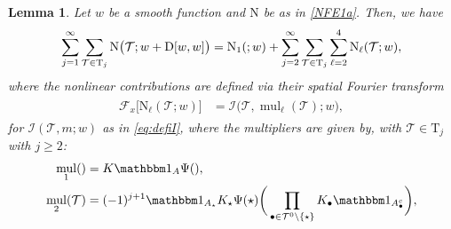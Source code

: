 \documentclass[%
11pt,  reqno]{amsart}
\makeatletter
\newcommand{\5}{\textup{V}}
\newcommand{\ind}{\mathbbm 1}
\newtheorem{lemma}[theorem]{Lemma}
\theoremstyle{remark}
\newcommand{\bul}{\bullet}
\newcommand{\TT}{\mathcal{T}}
\newcommand{\Tr}{\mathrm{T}}
\newcommand{\bfrak}{\mathfrak{b}}
\newcommand{\gfrak}{\mathfrak{g}}
\newcommand{\Ft}{{\mathcal{F}}}
\renewcommand{\l}{\ell}
\DeclareMathOperator{\mul}{mul}
\def\<#1>{\csname MH@symb@#1\endcsname}
\newcommand{\Ical}{\mathcal{I}}
\numberwithin{equation}{section}
\numberwithin{theorem}{section}
\newcommand{\NN}{\mathrm{N}}
\newcommand{\D}{\mathrm{D}}
\makeatother
\begin{document}
\begin{lemma}
\label{LEM:wint}
Let $w$ be a smooth function and $\NN$ be as in \eqref{NFE1a}.
Then, we have
\begin{align}
\label{wint0a}
\sum_{j=1}^\infty \sum_{\TT\in \Tr_j} \NN\big(\TT; w+
\D[w, w]
\big)
=
\NN_1(\<1>;w) + \sum_{j=2}^\infty \sum_{\TT\in\Tr_j} \sum_{\ell=2}^4  \NN_\ell(\TT; w),
\end{align}
where the nonlinear contributions are defined via their spatial Fourier transform
\begin{align}
\label{wint0b}
\begin{split}
\Ft_x \big[ \NN_\ell (\TT; w) \big] & =
\Ical \big(\TT, {\mul}_\l(\TT); w \big),
\end{split}
\end{align}
for $\Ical(\TT, m; w)$ as in \eqref{eq:defiI}, 
%
where the multipliers are given by, 
with $\TT\in \Tr_j$ with $j \ge 2$: %
\begin{align}
    \mul_1(\<1>)&= K\ind_A\Psi(\<1>),\\
    \mul_2(\TT)&=(-1)^{j+1} \ind_{A_\star} K_\star\Psi(\star) \bigg( \prod_{\bul \in \TT^0 \setminus\{\star\}}  K_\bul  \ind_{A_\bul^c} \bigg), 

\end{align}
\end{lemma}
\end{document}
